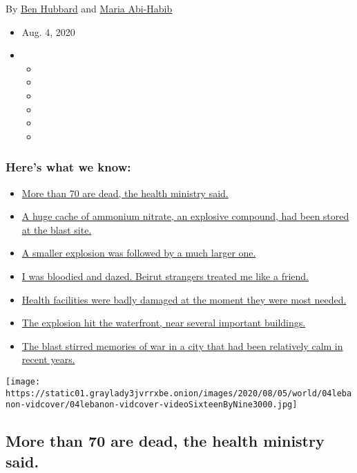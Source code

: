 By \href{https://www.nytimes3xbfgragh.onion/by/ben-hubbard}{Ben Hubbard}
and \href{https://www.nytimes3xbfgragh.onion/by/maria-abi-habib}{Maria
Abi-Habib}

\begin{itemize}
\item
  Aug. 4, 2020
\item
  \begin{itemize}
  \item
  \item
  \item
  \item
  \item
  \item
  \end{itemize}
\end{itemize}

\hypertarget{heres-what-we-know}{%
\subsubsection{Here's what we know:}\label{heres-what-we-know}}

\begin{itemize}
\tightlist
\item
  \protect\hyperlink{link-2e7a9219}{More than 70 are dead, the health
  ministry said.}
\item
  \protect\hyperlink{link-1971293e}{A huge cache of ammonium nitrate, an
  explosive compound, had been stored at the blast site.}
\item
  \protect\hyperlink{link-12ef1c10}{A smaller explosion was followed by
  a much larger one.}
\item
  \protect\hyperlink{link-1fdae9ed}{I was bloodied and dazed. Beirut
  strangers treated me like a friend.}
\item
  \protect\hyperlink{link-777231d6}{Health facilities were badly damaged
  at the moment they were most needed.}
\item
  \protect\hyperlink{link-1202af77}{The explosion hit the waterfront,
  near several important buildings.}
\item
  \protect\hyperlink{link-3a2e264f}{The blast stirred memories of war in
  a city that had been relatively calm in recent years.}
\end{itemize}

\texttt{[image: https://static01.graylady3jvrrxbe.onion/images/2020/08/05/world/04lebanon-vidcover/04lebanon-vidcover-videoSixteenByNine3000.jpg]}

\hypertarget{more-than-70-are-dead-the-health-ministry-said}{%
\subsection{More than 70 are dead, the health ministry
said.}\label{more-than-70-are-dead-the-health-ministry-said}}

